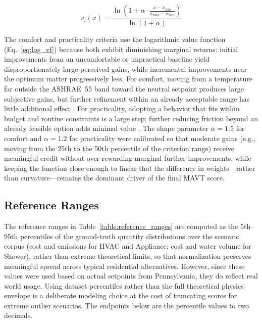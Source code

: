 \documentclass[a4paper,fleqn]{cas-dc}
\begin{document}
\begin{equation}
\label{eq:log_vf}
v_i(x) = \frac{\ln\!\left(1 + \alpha \cdot \frac{x - x_{\min}}{x_{\max} - x_{\min}}\right)}{\ln(1 + \alpha)}
\end{equation}

The comfort and practicality criteria use the logarithmic value function (Eq.~\ref{eq:log_vf}) because both exhibit diminishing marginal returns: initial improvements from an uncomfortable or impractical baseline yield disproportionately large perceived gains, while incremental improvements near the optimum matter progressively less. For comfort, moving from a temperature far outside the ASHRAE~55 band toward the neutral setpoint produces large subjective gains, but further refinement within an already acceptable range has little additional effect \citep{ashrae55,dedear2002}. For practicality, adopting a behavior that fits within budget and routine constraints is a large step; further reducing friction beyond an already feasible option adds minimal value \citep{ariely2001,leclerc1995}. The shape parameter $\alpha = 1.5$ for comfort and $\alpha = 1.2$ for practicality were calibrated so that moderate gains (e.g., moving from the 25th to the 50th percentile of the criterion range) receive meaningful credit without over-rewarding marginal further improvements, while keeping the function close enough to linear that the difference in weights---rather than curvature---remains the dominant driver of the final MAVT score.

\subsection{Reference Ranges}

The reference ranges in Table~\ref{table:reference_ranges} are computed as the 5th--95th percentiles of the ground-truth quantity distributions over the scenario corpus (cost and emissions for HVAC and Appliance; cost and water volume for Shower), rather than extreme theoretical limits, so that normalization preserves meaningful spread across typical residential alternatives. However, since these values were used based on actual setpoints from Pennsylvania, they do reflect real world usage. Using dataset percentiles rather than the full theoretical physics envelope is a deliberate modeling choice \citep{roszkowska2026} at the cost of truncating scores for extreme outlier scenarios. The endpoints below are the percentile values to two decimals.
\end{document}
